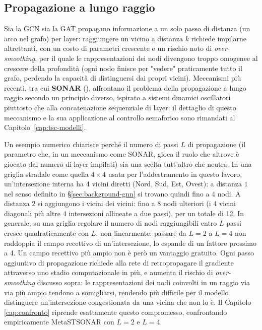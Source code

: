 \subsection{Propagazione a lungo raggio}

Sia la GCN sia la GAT propagano informazione a un solo passo di distanza
(un arco nel grafo) per layer: raggiungere un vicino a distanza $k$
richiede impilarne altrettanti, con un costo di parametri crescente e un
rischio noto di \emph{over-smoothing}, per il quale le rappresentazioni
dei nodi divengono troppo omogenee al crescere della profondità (ogni nodo
finisce per "vedere" praticamente tutto il grafo, perdendo la capacità di
distinguersi dai propri vicini). Meccanismi più recenti, tra cui
\textbf{SONAR} (\citealp{trenta2025sonar}), affrontano il problema della
propagazione a lungo raggio secondo un principio diverso, ispirato a
sistemi dinamici oscillatori piuttosto che alla concatenazione sequenziale
di layer: il dettaglio di questo meccanismo e la sua applicazione al
controllo semaforico sono rimandati al Capitolo~\ref{cap:tsc-modelli}.

Un esempio numerico chiarisce perché il numero di passi $L$ di
propagazione (il parametro che, in un meccanismo come SONAR, gioca il
ruolo che altrove è giocato dal numero di layer impilati) sia una scelta
tutt'altro che neutra. In una griglia stradale come quella $4\times4$
usata per l'addestramento in questo lavoro, un'intersezione interna ha 4
vicini diretti (Nord, Sud, Est, Ovest): a distanza $1$ nel senso definito
in §\ref{sec:background-gnn} si trovano quindi fino a 4 nodi. A distanza
$2$ si aggiungono i vicini dei vicini: fino a 8 nodi ulteriori (i 4 vicini
diagonali più altre 4 intersezioni allineate a due passi), per un totale
di 12. In generale, su una griglia regolare il numero di nodi raggiungibili
entro $L$ passi cresce quadraticamente con $L$, non linearmente: passare da
$L=2$ a $L=4$ non raddoppia il campo recettivo di un'intersezione, lo
espande di un fattore prossimo a 4. Un campo recettivo più ampio non è però
un vantaggio gratuito. Ogni passo aggiuntivo di propagazione richiede alla
rete di retropropagare il gradiente attraverso uno stadio computazionale in
più, e aumenta il rischio di \emph{over-smoothing} discusso sopra: le
rappresentazioni dei nodi coinvolti in un raggio via via più ampio tendono
a somigliarsi, rendendo più difficile per il modello distinguere
un'intersezione congestionata da una vicina che non lo è. Il Capitolo~%
\ref{cap:confronto} riprende esattamente questo compromesso, confrontando
empiricamente MetaSTSONAR con $L=2$ e $L=4$.

